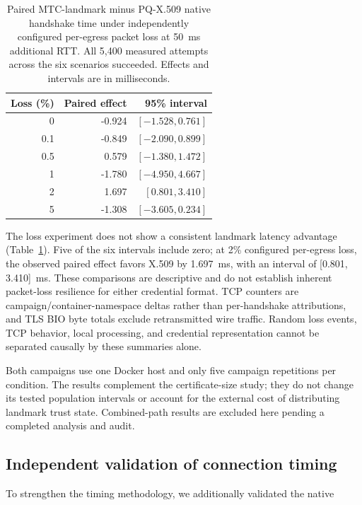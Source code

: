 \documentclass[journal]{IEEEtran}
\begin{document}
\begin{table}[t]
\caption{Paired MTC-landmark minus PQ-X.509 native handshake time under independently configured per-egress packet loss at 50~ms additional RTT. All 5,400 measured attempts across the six scenarios succeeded. Effects and intervals are in milliseconds.}
\label{tab:loss-mtc-effects}
\centering
\footnotesize
\begin{tabular}{rrr}
\toprule
Loss (\%) & Paired effect & 95\% interval \\
\midrule
0 & -0.924 & $[-1.528, 0.761]$ \\
0.1 & -0.849 & $[-2.090, 0.899]$ \\
0.5 & 0.579 & $[-1.380, 1.472]$ \\
1 & -1.780 & $[-4.950, 4.667]$ \\
2 & 1.697 & $[0.801, 3.410]$ \\
5 & -1.308 & $[-3.605, 0.234]$ \\
\bottomrule
\end{tabular}
\end{table}

The loss experiment does not show a consistent landmark latency advantage (Table~\ref{tab:loss-mtc-effects}). Five of the six intervals include zero; at 2\% configured per-egress loss, the observed paired effect favors X.509 by 1.697~ms, with an interval of [0.801, 3.410]~ms. These comparisons are descriptive and do not establish inherent packet-loss resilience for either credential format. TCP counters are campaign/container-namespace deltas rather than per-handshake attributions, and TLS BIO byte totals exclude retransmitted wire traffic. Random loss events, TCP behavior, local processing, and credential representation cannot be separated causally by these summaries alone.

Both campaigns use one Docker host and only five campaign repetitions per condition. The results complement the certificate-size study; they do not change its tested population intervals or account for the external cost of distributing landmark trust state. Combined-path results are excluded here pending a completed analysis and audit.

\subsection{Independent validation of connection timing}



To strengthen the timing methodology, we additionally validated the native
\end{document}
